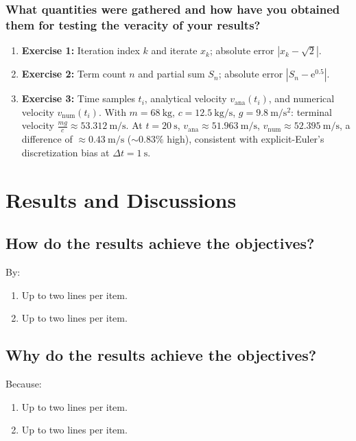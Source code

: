 \subsubsection{What quantities were gathered and how have you obtained them for testing the veracity of your results?}
\begin{enumerate}
  \item \textbf{Exercise 1:} Iteration index \(k\) and iterate \(x_k\); absolute error
  \(|x_k-\sqrt{2}|\).
  \item \textbf{Exercise 2:} Term count \(n\) and partial sum \(S_n\); absolute error
  \(|S_n-\mathrm{e}^{0.5}|\).
  \item \textbf{Exercise 3:} Time samples \(t_i\), analytical velocity \(v_{\mathrm{ana}}(t_i)\), and
  numerical velocity \(v_{\mathrm{num}}(t_i)\). With \(m=68~\mathrm{kg}\), \(c=12.5~\mathrm{kg/s}\),
  \(g=9.8~\mathrm{m/s^2}\): terminal velocity \(\tfrac{mg}{c}\approx 53.312~\mathrm{m/s}\).
  At \(t=20~\mathrm{s}\), \(v_{\mathrm{ana}}\approx 51.963~\mathrm{m/s}\),
  \(v_{\mathrm{num}}\approx 52.395~\mathrm{m/s}\), a difference of \(\approx 0.43~\mathrm{m/s}\)
  (\(\sim 0.83\%\) high), consistent with explicit-Euler’s discretization bias at \(\Delta t=1~\mathrm{s}\).
\end{enumerate}





















\section{Results and Discussions}

\subsection{How do the results achieve the objectives?}
By:
\begin{enumerate}
\item Up to two lines per item.
\item Up to two lines per item.
\end{enumerate}
	
\subsection{Why do the results achieve the objectives?}
Because:
\begin{enumerate}
\item Up to two lines per item.
\item Up to two lines per item.
\end{enumerate}

